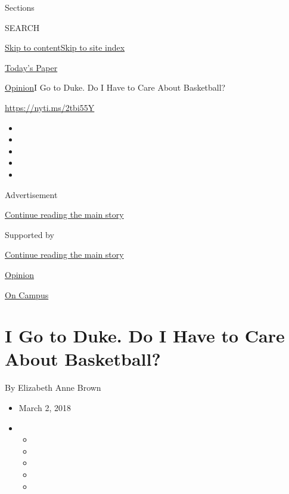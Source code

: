 Sections

SEARCH

\protect\hyperlink{site-content}{Skip to
content}\protect\hyperlink{site-index}{Skip to site index}

\href{https://myaccount.nytimes3xbfgragh.onion/auth/login?response_type=cookie\&client_id=vi}{}

\href{https://www.nytimes3xbfgragh.onion/section/todayspaper}{Today's
Paper}

\href{/section/opinion}{Opinion}\textbar{}I Go to Duke. Do I Have to
Care About Basketball?

\url{https://nyti.ms/2tbi55Y}

\begin{itemize}
\item
\item
\item
\item
\item
\end{itemize}

Advertisement

\protect\hyperlink{after-top}{Continue reading the main story}

Supported by

\protect\hyperlink{after-sponsor}{Continue reading the main story}

\href{/section/opinion}{Opinion}

\href{/column/on-campus}{On Campus}

\hypertarget{i-go-to-duke-do-i-have-to-care-about-basketball}{%
\section{I Go to Duke. Do I Have to Care About
Basketball?}\label{i-go-to-duke-do-i-have-to-care-about-basketball}}

By Elizabeth Anne Brown

\begin{itemize}
\item
  March 2, 2018
\item
  \begin{itemize}
  \item
  \item
  \item
  \item
  \item
  \end{itemize}
\end{itemize}

